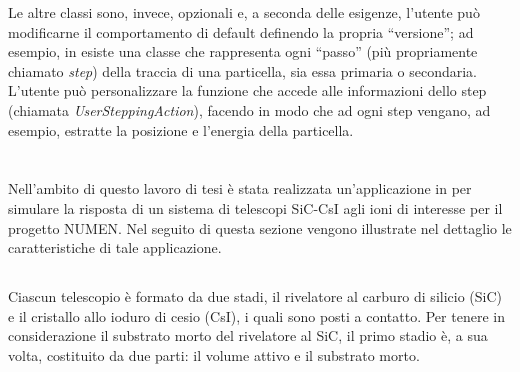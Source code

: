 Le altre classi sono, invece, opzionali e, a seconda delle esigenze, l'utente può modificarne il comportamento di default definendo la propria ``versione''; 
%
ad esempio, in \geant{} esiste una classe che rappresenta ogni ``passo'' (più propriamente chiamato \emph{step}) della traccia di una particella, sia essa primaria o secondaria.
L'utente può personalizzare la funzione che accede alle informazioni dello step (chiamata \emph{UserSteppingAction}), facendo in modo che ad ogni step vengano, ad esempio, estratte la posizione e l'energia della particella.


\section{}

Nell'ambito di questo lavoro di tesi è stata realizzata un'applicazione in \geant{} per simulare la risposta di un sistema di telescopi SiC-CsI agli ioni di interesse per il progetto NUMEN.
Nel seguito di questa sezione vengono illustrate nel dettaglio le caratteristiche di tale applicazione.




\subsection{} \label{par:geometria}

Ciascun telescopio è formato da due stadi, il rivelatore al carburo di silicio (SiC) e il cristallo allo ioduro di cesio (CsI), i quali sono posti a contatto.
Per tenere in considerazione il substrato morto del rivelatore al SiC, il primo stadio è, a sua volta, costituito da due parti: il volume attivo e il substrato morto.

